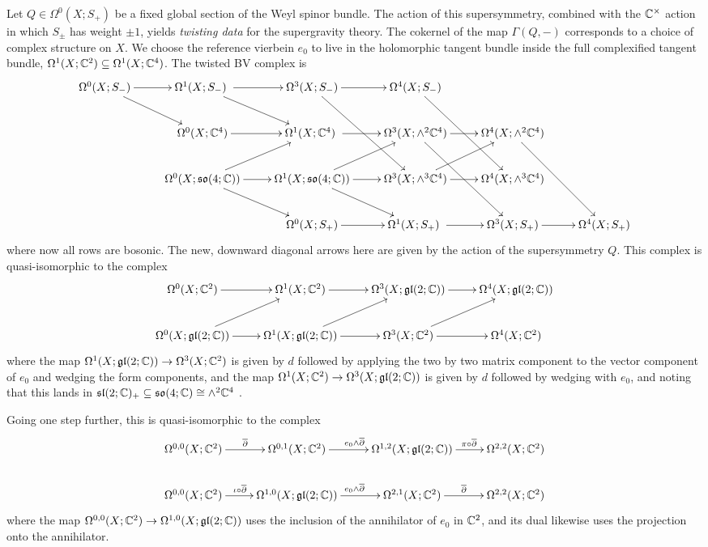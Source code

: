 \documentclass[10pt, oneside]{article}
\begin{document}
Let $Q \in \Omega^0(X; S_+)$ be a fixed global section of the Weyl spinor bundle.  The action of this supersymmetry, combined with the $\mathbb{C}^\times$ action in which $S_\pm$ has weight $\pm 1$, yields \emph{twisting data} for the supergravity theory.  The cokernel of the map $\Gamma(Q,-)$ corresponds to a choice of complex structure on $X$.  We choose the reference vierbein $e_0$ to live in the holomorphic tangent bundle inside the full complexified tangent bundle, $\Omega^1(X; \mathbb{C}^2) \subseteq \Omega^1(X;\mathbb{C}^4)$.  The twisted BV complex is
\[\xymatrix{
   \Omega^0(X; S_-) \ar[r] \ar[rd] & \Omega^1(X; S_-) \ar[r]\ \ar[rd] &\Omega^3(X; S_-) \ar[r] \ar[rdd] &\Omega^4(X; S_-) \ar[rdd] \\
   &\Omega^0(X; \CC^4) \ar[r] & \Omega^1(X; \CC^4) \ar[r]\ &\Omega^3(X; \wedge^2 \CC^4) \ar[r] \ar[rdd] &\Omega^4(X; \wedge^2 \CC^4) \ar[rdd] \\
   &\Omega^0(X; \so(4;\CC)) \ar[r] \ar[rd] \ar[ur] & \Omega^1(X; \so(4;\CC)) \ar[r] \ar[ru] \ar[rd] &\Omega^3(X; \wedge^3 \CC^4) \ar[r] \ar[ur] &\Omega^4(X; \wedge^3 \CC^4) \\ 
   &&\Omega^0(X; S_+) \ar[r] & \Omega^1(X; S_+) \ar[r]\ &\Omega^3(X; S_+) \ar[r] &\Omega^4(X; S_+) \\
}\]
where now all rows are bosonic.  The new, downward diagonal arrows here are given by the action of the supersymmetry $Q$.  This complex is quasi-isomorphic to the complex 
\[\xymatrix{
 \Omega^0(X; \CC^2) \ar[r] & \Omega^1(X; \CC^2) \ar[r] &\Omega^3(X; \gl(2;\CC)) \ar[r] &\Omega^4(X; \gl(2;\CC)) \\
   \Omega^0(X; \gl(2;\CC)) \ar[r] \ar[ur] & \Omega^1(X; \gl(2;\CC)) \ar[r] \ar[ur] &\Omega^3(X; \CC^2) \ar[r] \ar[ur] &\Omega^4(X; \CC^2) \\
}\]
where the map $\Omega^1(X; \mathfrak{gl}(2;\mathbb{C})) \to \Omega^3(X; \mathbb{C}^2)$ is given by $d$ followed by applying the two by two matrix component to the vector component of $e_0$ and wedging the form components, and the map $\Omega^1(X; \mathbb{C}^2) \to \Omega^3(X; \mathfrak{gl}(2;\mathbb{C}))$ is given by $d$ followed by wedging with $e_0$, and noting that this lands in $\mathfrak{sl}(2;\mathbb{C})_+ \subseteq \mathfrak{so}(4;\mathbb{C}) \cong \wedge^2 \mathbb{C}^4$ .

Going one step further, this is quasi-isomorphic to the complex
\[\xymatrix{
\Omega^{0,0}(X; \CC^2) \ar[r]^{\ol \dd} &\Omega^{0,1}(X; \CC^2) \ar[r]^{e_0 \wedge \ol \dd} &\Omega^{1,2}(X; \gl(2;\CC)) \ar[r]^(.55){\pi \circ \ol \dd} &\Omega^{2,2}(X;\CC^2)\\
\Omega^{0,0}(X;\CC^2) \ar[r]^(.45){\iota \circ \ol \dd}&\Omega^{1,0}(X; \gl(2;\CC)) \ar[r]^{e_0 \wedge \ol \dd} &\Omega^{2,1}(X; \CC^2) \ar[r]^{\ol \dd} &\Omega^{2,2}(X;\CC^2)
}\]
where the map $\Omega^{0,0}(X;\mathbb{C}^2) \to \Omega^{1,0}(X; \mathfrak{gl}(2;\mathbb{C}))$ uses the inclusion of the annihilator of $e_0$ in $\mathbb{C}^2$, and its dual likewise uses the projection onto the annihilator.
\end{document}
